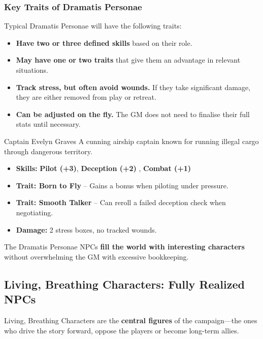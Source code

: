\subsubsection{Key Traits of Dramatis Personae}
Typical Dramatis Personae will have the following traits:
\begin{itemize}
    \item \textbf{Have two or three defined skills} based on their role.
    \item \textbf{May have one or two traits} that give them an advantage in relevant situations.
    \item \textbf{Track stress, but often avoid wounds.} If they take significant damage, they are either removed from play or retreat.
    \item \textbf{Can be adjusted on the fly.} The GM does not need to finalise their full stats until necessary.
\end{itemize}

\begin{Example}{Captain Evelyn Graves}
	A cunning airship captain known for running illegal cargo through dangerous territory.
	\begin{itemize}
    	\item \textbf{Skills:} \textbf{Pilot (+3)}, \textbf{Deception (+2)} , \textbf{Combat (+1)} 
	    \item \textbf{Trait: Born to Fly} – Gains a bonus when piloting under pressure.
        \item \textbf{Trait: Smooth Talker} – Can reroll a failed deception check when negotiating.
    	\item \textbf{Damage:} 2 stress boxes, no tracked wounds.
	\end{itemize}
\end{Example}

The Dramatis Personae NPCs \textbf{fill the world with interesting characters} without overwhelming the GM with excessive bookkeeping.

\subsection{Living, Breathing Characters: Fully Realized NPCs}

Living, Breathing Characters are the \textbf{central figures} of the campaign—the ones who drive the story forward, oppose the players or become long-term allies.

